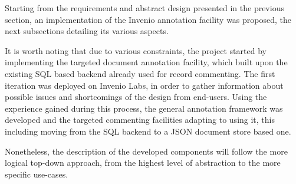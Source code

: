 
Starting from the requirements and abstract design presented in the previous
section, an implementation of the Invenio annotation facility was proposed,
the next subsections detailing its various aspects.

It is worth noting that due to various constraints, the project started by
implementing the targeted document annotation facility, which built upon the
existing SQL based backend already used for record commenting. The first
iteration was deployed on Invenio Labs, in order to gather information about
possible issues and shortcomings of the design from end-users. Using the
experience gained during this process, the general annotation framework was
developed and the targeted commenting facilities adapting to using it, this
including moving from the SQL backend to a JSON document store based one.

Nonetheless, the description of the developed components will follow the more
logical top-down approach, from the highest level of abstraction to the more
specific use-cases.
